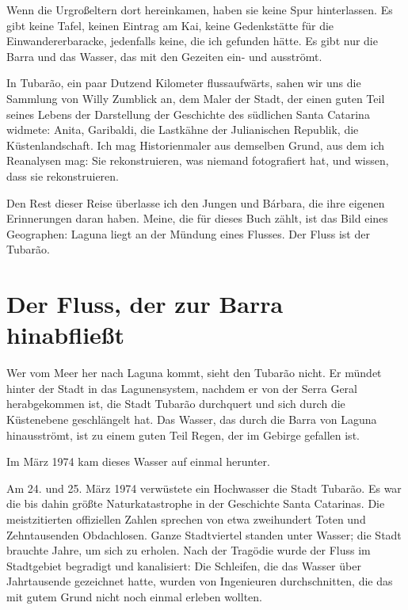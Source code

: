 \documentclass[
  ngerman,
  11pt,
  openany]{book}
\begin{document}
Wenn die Urgroßeltern dort hereinkamen, haben sie keine Spur
hinterlassen. Es gibt keine Tafel, keinen Eintrag am Kai, keine
Gedenkstätte für die Einwandererbaracke, jedenfalls keine, die ich
gefunden hätte. Es gibt nur die Barra und das Wasser, das mit den
Gezeiten ein- und ausströmt.

In Tubarão, ein paar Dutzend Kilometer flussaufwärts, sahen wir uns die
Sammlung von Willy Zumblick an, dem Maler der Stadt, der einen guten
Teil seines Lebens der Darstellung der Geschichte des südlichen Santa
Catarina widmete: Anita, Garibaldi, die Lastkähne der Julianischen
Republik, die Küstenlandschaft. Ich mag Historienmaler aus demselben
Grund, aus dem ich Reanalysen mag: Sie rekonstruieren, was niemand
fotografiert hat, und wissen, dass sie rekonstruieren.

Den Rest dieser Reise überlasse ich den Jungen und Bárbara, die ihre
eigenen Erinnerungen daran haben. Meine, die für dieses Buch zählt, ist
das Bild eines Geographen: Laguna liegt an der Mündung eines Flusses.
Der Fluss ist der Tubarão.

\section{Der Fluss, der zur Barra
hinabfließt}\label{der-fluss-der-zur-barra-hinabflieuxdft}

Wer vom Meer her nach Laguna kommt, sieht den Tubarão nicht. Er mündet
hinter der Stadt in das Lagunensystem, nachdem er von der Serra Geral
herabgekommen ist, die Stadt Tubarão durchquert und sich durch die
Küstenebene geschlängelt hat. Das Wasser, das durch die Barra von Laguna
hinausströmt, ist zu einem guten Teil Regen, der im Gebirge gefallen
ist.

Im März 1974 kam dieses Wasser auf einmal herunter.

Am 24. und 25. März 1974 verwüstete ein Hochwasser die Stadt Tubarão. Es
war die bis dahin größte Naturkatastrophe in der Geschichte Santa
Catarinas. Die meistzitierten offiziellen Zahlen sprechen von etwa
zweihundert Toten und Zehntausenden Obdachlosen. Ganze Stadtviertel
standen unter Wasser; die Stadt brauchte Jahre, um sich zu erholen. Nach
der Tragödie wurde der Fluss im Stadtgebiet begradigt und kanalisiert:
Die Schleifen, die das Wasser über Jahrtausende gezeichnet hatte, wurden
von Ingenieuren durchschnitten, die das mit gutem Grund nicht noch
einmal erleben wollten.
\end{document}
